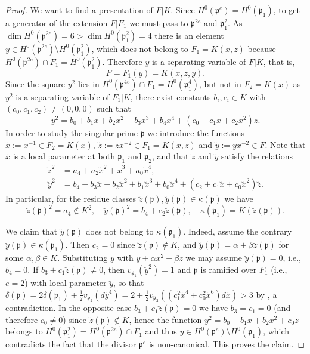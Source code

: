 \documentclass[12pt,reqno]{amsart}
\newcommand{\todoo}[2][]{\todo[size=tiny, #1]{#2}} %
\newcommand{\toda}[2][]{\todo[color=blue!30, #1]{#2}} %
\theoremstyle{definition}
\newcommand{\cx}{{\breve{x}}}
\newcommand{\cy}{{\breve{y}}}
\newcommand{\cz}{{\breve{z}}}
\newcommand{\pp}{\mathfrak{p}}
\newcommand{\al}{\alpha}
\newcommand{\be}{\beta}
\newcommand{\de}{\delta}
\newcommand{\ka}{\kappa}
\begin{document}
\begin{proof}
We want to find a presentation of $F|K$.
Since $H^0(\pp^e)=H^0(\pp_1)$, to get a generator of the extension $F|F_1$ we must pass to $\pp^{2e}$ and $\pp_1^2$.
As $\dim H^0(\pp^{2e})=6 > \dim H^0(\pp_1^2)=4$ there is an element $y\in H^0(\pp^{2e})\setminus H^0(\pp_1^2)$, which does not belong to $F_1=K(x,z)$ because $H^0(\pp^{2e}) \cap F_1 = H^0(\pp_1^2)$.
Therefore $y$ is a separating variable of $F|K$, that is, \[ F=F_1(y) = K(x,z,y). \]
Since the square $y^2$ lies in $H^0(\pp^{4e})\cap F_1 = H^0(\pp_1^4)$, but not in $F_2=K(x)$ as $y^2$ is a separating variable of $F_1|K$, 
there exist constants $b_i,c_i\in K$ with $(c_0,c_1,c_2)\neq (0,0,0)$ such that 
\[ 
y^2 %
= b_0 + b_1 x + b_2 x^2 + b_3 x^3 + b_4 x^4 + (c_0 + c_1 x + c_2 x^2) z. 
\]
In order to study the singular prime $\pp$ %
we introduce the functions $\cx:=x^{-1}\in F_2 = K(x)$, $\cz:=zx^{-2} \in F_1=K(x,z)$ and $\cy:= yx^{-2} \in F$.
Note that $\cx$ is a local parameter at both $\pp_1$ and $\pp_2$, and that $\cz$ and $\cy$ satisfy the relations
\begin{align*}
    \cz^2 &= a_4 + a_2 \cx^2 + \cx^3 + a_0 \cx^4, \\
    \cy^2 &= b_4 + b_3 \cx + b_2 \cx^2 + b_1 \cx^3 + b_0 \cx^4 + (c_2 + c_1 \cx + c_0 \cx^2) \cz. 
\end{align*}
In particular, for the residue classes $\cz(\pp),\cy(\pp) \in \ka(\pp)$ we have
\[ \cz(\pp)^2 = a_4 \notin K^2, \quad \cy(\pp)^2 = b_4 + c_2 \cz(\pp),\quad \ka(\pp_1) = K(\cz(\pp)) . \]

We claim that $\cy(\pp)$ does not belong to $\ka(\pp_1)$.
Indeed, assume the contrary $\breve y(\pp) \in \ka(\pp_1)$.
Then $c_2=0$ since $\cz(\pp)\notin K$, 
and $\cy(\pp) = \al + \be \cz(\pp)$ for some $\al,\be \in K$. 
Substituting $y$ with $y + \al x^2 + \be z$ we may assume $\cy(\pp)=0$, i.e., $b_4=0$.
If $b_3 + c_1 \cz(\pp) \neq 0$, then $v_{\pp_1}(\cy^2)=1$ and $\pp$ is ramified over $F_1$ (i.e., $e=2$) with local parameter $\cy$, so that $\de(\pp) = 2 \de(\pp_1) + \frac 12 v_{\pp_2} (d\cy^4) = 2 + \frac 12 v_{\pp_2}((c_1^2 \cx^4 + c_0^2 \cx^6)d\cx) > 3$ by \cite[Theorem~2.3]{BedSt87}, a contradiction.
In the opposite case $b_3 + c_1 \cz(\pp) = 0$ we have $b_3=c_1=0$ (and therefore $c_0\neq 0$) since $\cz(\pp)\notin K$, hence the function $y^2 = b_0 + b_1 x + b_2 x^2 + c_0 z$ belongs to $H^0(\pp_1^2) = H^0(\pp^{2e}) \cap F_1$ and thus $y\in H^0(\pp^e) \setminus H^0(\pp_1)$, which contradicts the fact that the divisor $\pp^e$ is non-canonical.
This proves the claim.


\end{proof}
\end{document}
